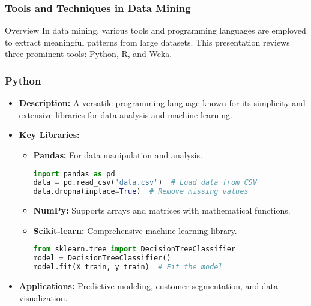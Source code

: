 \documentclass[aspectratio=169]{beamer}
\begin{document}
\begin{frame}
    \frametitle{Tools and Techniques in Data Mining}
    \begin{block}{Overview}
        In data mining, various tools and programming languages are employed to extract meaningful patterns from large datasets. This presentation reviews three prominent tools: Python, R, and Weka.
    \end{block}
\end{frame}

\begin{frame}[fragile]
    \frametitle{Python}
    \begin{itemize}
        \item \textbf{Description:} A versatile programming language known for its simplicity and extensive libraries for data analysis and machine learning.
        \item \textbf{Key Libraries:}
        \begin{itemize}
            \item \textbf{Pandas:} For data manipulation and analysis.
            \begin{lstlisting}[language=Python]
import pandas as pd
data = pd.read_csv('data.csv')  # Load data from CSV
data.dropna(inplace=True)  # Remove missing values
            \end{lstlisting}
            
            \item \textbf{NumPy:} Supports arrays and matrices with mathematical functions.
            \item \textbf{Scikit-learn:} Comprehensive machine learning library.
            \begin{lstlisting}[language=Python]
from sklearn.tree import DecisionTreeClassifier
model = DecisionTreeClassifier()
model.fit(X_train, y_train)  # Fit the model
            \end{lstlisting}
        \end{itemize}
        \item \textbf{Applications:} Predictive modeling, customer segmentation, and data visualization.
    \end{itemize}
\end{frame}
\end{document}
